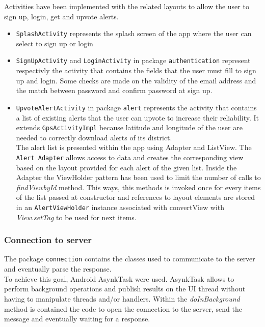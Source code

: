 \documentclass[a4paper,12pt]{report}
\begin{document}
Activities have been implemented with the related layouts to allow the user to sign up, login, get and upvote alerts.
\begin{itemize}
\item \texttt{SplashActivity} represents the splash screen of the app where the user can select to sign up or login
\item \texttt{SignUpActivity} and \texttt{LoginActivity} in package \texttt{authentication} represent respectivly the activity that contains the fields that the user must fill to sign up and login. Some checks are made on the validity of the email address and the match between password and confirm password at sign up.
\item \texttt{UpvoteAlertActivity} in package \texttt{alert} represents the activity that contains a list of existing alerts that the user can upvote to increase their reliability. It extends \texttt{GpsActivityImpl} because latitude and longitude of the user are needed to correctly download alerts of its district. \\
The alert list is presented within the app using Adapter and ListView. The \texttt{Alert Adapter} allows access to data and creates the corresponding view based on the layout provided for each alert of the given list. Inside the Adapter the ViewHolder pattern has been used to limit the number of calls to \textit{findViewbyId} method. This ways, this methods is invoked once for every items of the list passed at constructor and references to layout elements are stored in an \texttt{AlertViewHolder} instance associated with convertView with \textit{View.setTag} to be used for next items.
\end{itemize}


\subsubsection{Connection to server}
The package \texttt{connection} contains the classes used to communicate to the server and eventually parse the response.
\\To achieve this goal, Android AsynkTask were used. AsynkTask allows to perform background operations and publish results on the UI thread without having to manipulate threads and/or handlers. Within the \textit{doInBackground} method is contained the code to open the connection to the server, send the message and eventually waiting for a response.
\end{document}
